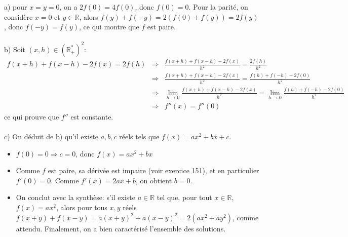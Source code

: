 a) pour $x=y=0$, on a $2f(0)=4f(0)$, donc $f(0)=0$. Pour la parité, on considère $x=0$ et $y\in\mathbb{R}$, alors $f(y)+f(-y)=2(f(0)+f(y)) = 2f(y)$, donc $f(-y)=f(y)$, ce qui montre que $f$ est paire.\\ \\
b) Soit $(x,h)\in (\mathbb{R}^*_+)^2$:
\begin{eqnarray*}
 f(x+h)+f(x-h) - 2f(x) = 2f(h) & \Rightarrow &  \frac{f(x+h)+f(x-h) - 2f(x)}{h^2} = \frac{2f(h)}{h^2} \\
 & \Rightarrow &  \frac{f(x+h)+f(x-h) - 2f(x)}{h^2} = \frac{f(h)+f(-h)-2f(0)}{h^2} \\
  & \Rightarrow &  \lim_{h\to 0} \frac{f(x+h)+f(x-h) - 2f(x)}{h^2} = \lim_{h \to 0}\frac{f(h)+f(-h)-2f(0)}{h^2} \\
  & \Rightarrow &  f''(x) = f''(0)
\end{eqnarray*}
ce qui prouve que $f''$ est constante. \\ \\
c) On déduit de b) qu'il existe $a,b,c$ réels tels que $f(x)=ax^2+bx+c$. 
\begin{itemize}
  \item $f(0)=0 \Rightarrow c=0$, donc $f(x)=ax^2+bx$
  \item Comme $f$ est paire, sa dérivée est impaire (voir exercice 151), et en particulier $f'(0)=0$. Comme $f'(x)=2ax+b$, on obtient $b=0$.
  \item On conclut avec la synthèse: s'il existe $a\in \mathbb{R}$ tel que, pour tout $x\in\mathbb{R}$, $f(x)=ax^2$, alors pour tous $x,y$ réels $f(x+y)+f(x-y)=a(x+y)^2+a(x-y)^2=2(ax^2+ay^2)$, comme attendu. Finalement, on a bien caractérisé l'ensemble des solutions. 
\end{itemize}
